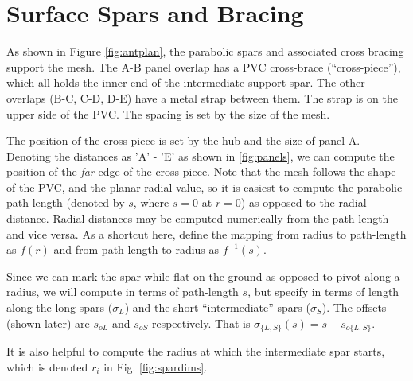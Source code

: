 \documentclass{article}
\begin{document}
\section{Surface Spars and Bracing}
As shown in Figure \ref{fig:antplan}, the parabolic spars and associated cross bracing support the mesh.  The A-B panel overlap has a PVC cross-brace (``cross-piece''), which all holds the inner end of the intermediate support spar.  The other overlaps (B-C, C-D, D-E) have a metal strap between them. The strap is on the upper side of the PVC.  The spacing is set by the size of the mesh.

The position of the cross-piece is set by the hub and the size of panel A.  Denoting the distances as 'A' - 'E' as shown in \ref{fig:panels}, we can compute the position of the {\em far} edge of the cross-piece.  Note that the mesh follows the shape of the PVC, and the planar radial value, so it is easiest to compute the parabolic path length (denoted  by $s$, where $s=0$ at $r=0$) as opposed to the radial distance.  Radial distances may be computed numerically from the path length and vice versa.  As a shortcut here, define the mapping from radius to path-length as $f(r)$ and from path-length to radius as $f^{-1}(s)$.

Since we can mark the spar while flat on the ground as opposed to pivot along a radius, we will compute in terms of path-length $s$, but specify in terms of length along the long spars ($\sigma_L$) and the short ``intermediate'' spars ($\sigma_S$).  The offsets (shown later) are $s_{oL}$ and $s_{oS}$ respectively. That is $\sigma_{\{L,S\}}(s) = s - s_{o\{L,S\}}$. 

It is also helpful to compute the radius at which the intermediate spar starts, which is denoted $r_i$ in Fig. \ref{fig:spardims}.
\end{document}
